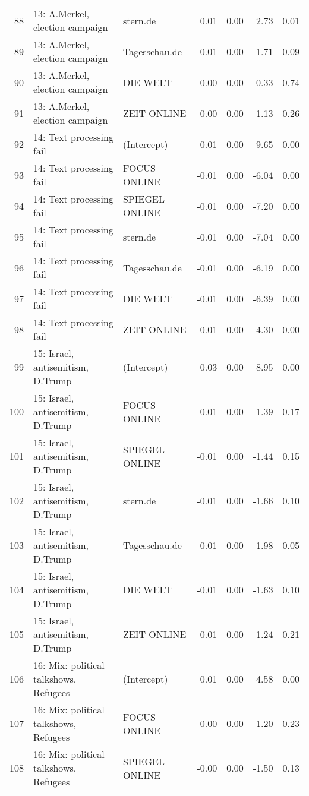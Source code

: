 \begin{table}[ht]
{\begin{tabular}{rllrrrr}
  88 & 13: A.Merkel, election campaign & stern.de & 0.01 & 0.00 & 2.73 & 0.01 \\ 
  89 & 13: A.Merkel, election campaign & Tagesschau.de & -0.01 & 0.00 & -1.71 & 0.09 \\ 
  90 & 13: A.Merkel, election campaign & DIE WELT & 0.00 & 0.00 & 0.33 & 0.74 \\ 
  91 & 13: A.Merkel, election campaign & ZEIT ONLINE & 0.00 & 0.00 & 1.13 & 0.26 \\ 
  92 & 14: Text processing fail & (Intercept) & 0.01 & 0.00 & 9.65 & 0.00 \\ 
  93 & 14: Text processing fail & FOCUS ONLINE & -0.01 & 0.00 & -6.04 & 0.00 \\ 
  94 & 14: Text processing fail & SPIEGEL ONLINE & -0.01 & 0.00 & -7.20 & 0.00 \\ 
  95 & 14: Text processing fail & stern.de & -0.01 & 0.00 & -7.04 & 0.00 \\ 
  96 & 14: Text processing fail & Tagesschau.de & -0.01 & 0.00 & -6.19 & 0.00 \\ 
  97 & 14: Text processing fail & DIE WELT & -0.01 & 0.00 & -6.39 & 0.00 \\ 
  98 & 14: Text processing fail & ZEIT ONLINE & -0.01 & 0.00 & -4.30 & 0.00 \\ 
  99 & 15: Israel, antisemitism, D.Trump & (Intercept) & 0.03 & 0.00 & 8.95 & 0.00 \\ 
  100 & 15: Israel, antisemitism, D.Trump & FOCUS ONLINE & -0.01 & 0.00 & -1.39 & 0.17 \\ 
  101 & 15: Israel, antisemitism, D.Trump & SPIEGEL ONLINE & -0.01 & 0.00 & -1.44 & 0.15 \\ 
  102 & 15: Israel, antisemitism, D.Trump & stern.de & -0.01 & 0.00 & -1.66 & 0.10 \\ 
  103 & 15: Israel, antisemitism, D.Trump & Tagesschau.de & -0.01 & 0.00 & -1.98 & 0.05 \\ 
  104 & 15: Israel, antisemitism, D.Trump & DIE WELT & -0.01 & 0.00 & -1.63 & 0.10 \\ 
  105 & 15: Israel, antisemitism, D.Trump & ZEIT ONLINE & -0.01 & 0.00 & -1.24 & 0.21 \\ 
  106 & 16: Mix: political talkshows, Refugees & (Intercept) & 0.01 & 0.00 & 4.58 & 0.00 \\ 
  107 & 16: Mix: political talkshows, Refugees & FOCUS ONLINE & 0.00 & 0.00 & 1.20 & 0.23 \\ 
  108 & 16: Mix: political talkshows, Refugees & SPIEGEL ONLINE & -0.00 & 0.00 & -1.50 & 0.13 \\ 

\end{tabular}}
\end{table}
